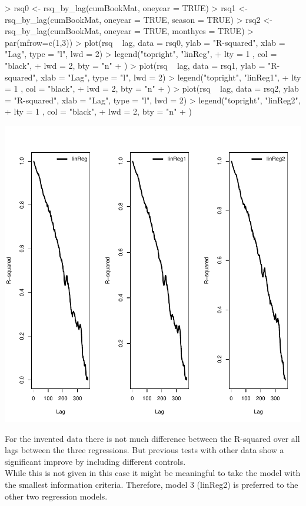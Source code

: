 \documentclass[nojss]{jss}
\begin{document}
\begin{Schunk}
\begin{Sinput}
> rsq0 <- rsq_by_lag(cumBookMat, oneyear = TRUE)
> rsq1 <- rsq_by_lag(cumBookMat, oneyear = TRUE, season = TRUE)
> rsq2 <- rsq_by_lag(cumBookMat, oneyear = TRUE, monthyes = TRUE)
> par(mfrow=c(1,3))
> plot(rsq ~ lag, data = rsq0, ylab = "R-squared", xlab = "Lag", type = "l", lwd = 2)
> legend("topright", "linReg",
+        lty = 1 , col = "black",
+        lwd = 2, bty = "n"
+ )
> plot(rsq ~ lag, data = rsq1, ylab = "R-squared", xlab = "Lag", type = "l", lwd = 2)
> legend("topright", "linReg1",
+        lty = 1 , col = "black",
+        lwd = 2, bty = "n"
+ )
> plot(rsq ~ lag, data = rsq2, ylab = "R-squared", xlab = "Lag", type = "l", lwd = 2)
> legend("topright", "linReg2",
+        lty = 1 , col = "black",
+        lwd = 2, bty = "n"
+ )
\end{Sinput}
\end{Schunk}
\includegraphics{bookMatrix-tex-008}

For the invented data there is not much difference between the R-squared over all lags between the three regressions. But previous tests with other data show a significant improve by including different controls. \\
While this is not given in this case it might be meaningful to take the model with the smallest information criteria. Therefore, model 3 (linReg2) is preferred to the other two regression models.
\end{document}
